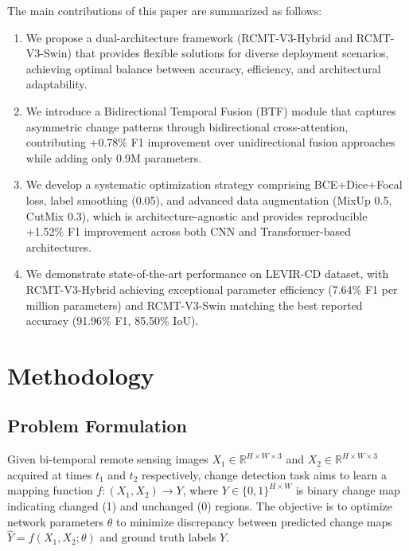 \documentclass[journal]{IEEEtran}
\begin{document}
{The main contributions of this paper are summarized as follows:

\begin{enumerate}
\item We propose a dual-architecture framework (RCMT-V3-Hybrid and RCMT-V3-Swin) that provides flexible solutions for diverse deployment scenarios, achieving optimal balance between accuracy, efficiency, and architectural adaptability.

\item We introduce a Bidirectional Temporal Fusion (BTF) module that captures asymmetric change patterns through bidirectional cross-attention, contributing +0.78\% F1 improvement over unidirectional fusion approaches while adding only 0.9M parameters.

\item We develop a systematic optimization strategy comprising BCE+Dice+Focal loss, label smoothing (0.05), and advanced data augmentation (MixUp 0.5, CutMix 0.3), which is architecture-agnostic and provides reproducible +1.52\% F1 improvement across both CNN and Transformer-based architectures.

\item We demonstrate state-of-the-art performance on LEVIR-CD dataset, with RCMT-V3-Hybrid achieving exceptional parameter efficiency (7.64\% F1 per million parameters) and RCMT-V3-Swin matching the best reported accuracy (91.96\% F1, 85.50\% IoU).
\end{enumerate}

\section{Methodology}

\subsection{Problem Formulation}

Given bi-temporal remote sensing images $X_1 \in \mathbb{R}^{H \times W \times 3}$ and $X_2 \in \mathbb{R}^{H \times W \times 3}$ acquired at times $t_1$ and $t_2$ respectively, change detection task aims to learn a mapping function $f: (X_1, X_2) \rightarrow Y$, where $Y \in \{0,1\}^{H \times W}$ is binary change map indicating changed (1) and unchanged (0) regions. The objective is to optimize network parameters $\theta$ to minimize discrepancy between predicted change maps $\hat{Y} = f(X_1, X_2; \theta)$ and ground truth labels $Y$.

}
\end{document}
